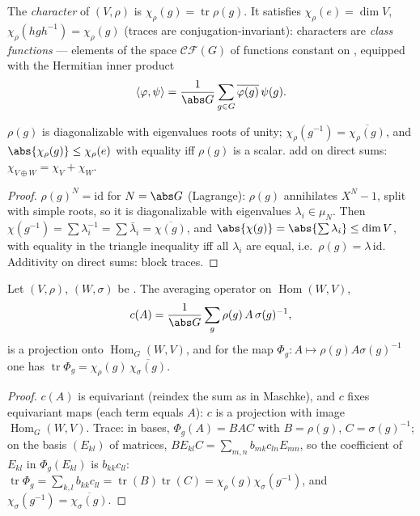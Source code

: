 \begin{definition}\label{def:b3:representations:character}
The \emph{character} of $(V, \rho)$ is
$\chi_\rho(g) = \operatorname{tr}\rho(g)$. It satisfies
$\chi_\rho(e) = \dim V$, $\chi_\rho(hgh^{-1}) = \chi_\rho(g)$
(traces are conjugation-invariant): characters are \emph{class
functions} --- elements of the space
$\mathcal{CF}(G)$ of functions constant on ,
equipped with the Hermitian inner product
\[
\langle \varphi, \psi\rangle = \frac1{\abs G}\sum_{g \in G}
\overline{\varphi(g)}\,\psi(g).
\]
\end{definition}

\begin{proposition}\label{prop:b3:representations:charbasics}
$\rho(g)$ is diagonalizable with eigenvalues roots of unity;
$\chi_\rho(g^{-1}) = \overline{\chi_\rho(g)}$, and
$\abs{\chi_\rho(g)} \leq \chi_\rho(e)$ with equality iff
$\rho(g)$ is a scalar.  add on direct sums: $\chi_{V
\oplus W} = \chi_V + \chi_W$.
\end{proposition}

\begin{proof}
$\rho(g)^N = \mathrm{id}$ for $N = \abs G$ (Lagrange): $\rho(g)$
annihilates $X^N - 1$, split with simple roots, so it is
diagonalizable with eigenvalues $\lambda_i \in \mu_N$. Then
$\chi(g^{-1}) = \sum \lambda_i^{-1} = \sum\bar\lambda_i =
\overline{\chi(g)}$, and $\abs{\chi(g)} = \abs{\sum\lambda_i}
\leq \dim V$, with equality in the triangle inequality iff all
$\lambda_i$ are equal, i.e.\ $\rho(g) = \lambda\,\mathrm{id}$.
Additivity on direct sums: block traces.
\end{proof}

\begin{lemma}\label{lem:b3:representations:homtrace}
Let $(V, \rho)$, $(W, \sigma)$ be . The averaging
operator on $\operatorname{Hom}(W, V)$,
\[
c(A) = \frac1{\abs G}\sum_{g}\rho(g)\,A\,\sigma(g)^{-1},
\]
is a projection onto $\operatorname{Hom}_G(W, V)$, and for the
map $\Phi_g \colon A \mapsto \rho(g)A\sigma(g)^{-1}$ one has
$\operatorname{tr}\Phi_g =
\chi_\rho(g)\,\overline{\chi_\sigma(g)}$.
\end{lemma}

\begin{proof}
$c(A)$ is equivariant (reindex the sum as in Maschke), and $c$
fixes equivariant maps (each term equals $A$): $c$ is a
projection with image $\operatorname{Hom}_G(W, V)$. Trace: in
bases, $\Phi_g(A) = BAC$ with $B = \rho(g)$, $C = \sigma(g)^{-1}$;
on the basis $(E_{kl})$ of matrices, $BE_{kl}C = \sum_{m,n}
b_{mk}c_{ln}E_{mn}$, so the coefficient of $E_{kl}$ in
$\Phi_g(E_{kl})$ is $b_{kk}c_{ll}$: $\operatorname{tr}\Phi_g =
\sum_{k,l}b_{kk}c_{ll} = \operatorname{tr}(B)
\operatorname{tr}(C) = \chi_\rho(g)\chi_\sigma(g^{-1})$, and
$\chi_\sigma(g^{-1}) = \overline{\chi_\sigma(g)}$.
\end{proof}

